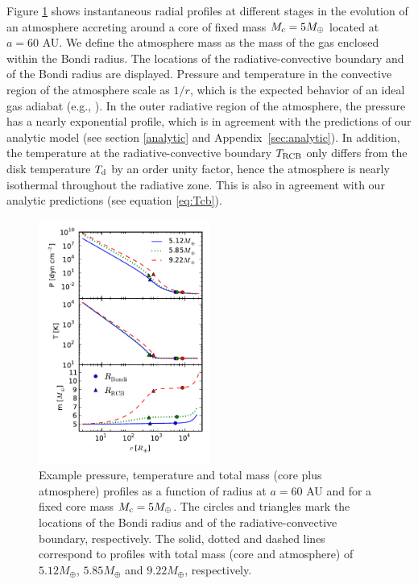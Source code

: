 \documentclass[apj]{emulateapj}
\newcommand{\App}[1]{Appendix~\ref{#1}}
\begin{document}
Figure \ref{fig:profiles} shows instantaneous radial profiles at different stages in the evolution of an atmosphere accreting around a core of fixed mass $M_{\rm{c}}=5 M_{\oplus}$ located at $a=60$ AU.  We define the atmosphere mass as the mass of the gas enclosed within the Bondi radius. The locations of the radiative-convective boundary and of the Bondi radius are displayed. Pressure and temperature in the convective region of the atmosphere scale as $1/r$, which is the expected behavior of an ideal gas adiabat (e.g., \citealt{rafikov06}). In the outer radiative region of the atmosphere, the pressure has a nearly exponential profile, which is in agreement with the predictions of our analytic model (see section \ref{analytic} and \App{sec:analytic}). In addition, the temperature at the radiative-convective boundary $T_{\rm{RCB}}$ only differs from the disk temperature $T_{\rm{d}}$ by an order unity factor, hence the atmosphere is nearly isothermal throughout the radiative zone. This is also in agreement with our analytic predictions (see equation \ref{eq:Tcb}). %

\begin{figure}[h]
\centering
\includegraphics[width=0.5\textwidth]{../../figs/ModelAtmospheres/RadSelfGravPoly/PaperFigs/PTm_profiles_v2.pdf}
\caption{Example pressure, temperature and total mass (core plus atmosphere) profiles as a function of radius at $a=60$ AU and for a fixed core mass $M_{\rm c}=5 M_{\oplus}$. The circles and triangles mark the locations of the Bondi radius and of the radiative-convective boundary, respectively. The solid, dotted and dashed lines correspond to profiles with total mass (core and atmosphere) of $5.12 M_{\oplus}$, $5.85 M_{\oplus}$ and $9.22 M_{\oplus}$, respectively.}
\label{fig:profiles}
\end{figure}
\end{document}

